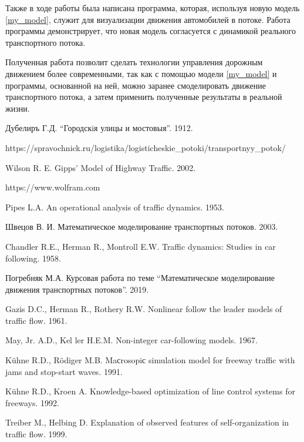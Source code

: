 \documentclass[12pt, a4paper]{extarticle}
\numberwithin{equation}{section}
\numberwithin{figure}{section}
\begin{document}
Также в ходе работы была написана программа, которая, используя новую модель \eqref{my_model}, служит для визуализации движения автомобилей в потоке. Работа программы демонстрирует, что новая модель согласуется с динамикой реального транспортного потока.

Полученная работа позволит сделать технологии управления дорожным движением более современными, так как с помощью модели \eqref{my_model} и программы, основанной на ней, можно заранее смоделировать движение транспортного потока, а затем применить полученные результаты в реальной жизни.
\newpage

\begin{thebibliography}{**}
	Дубелиръ Г.Д. ``Городскiя улицы и мостовыя''. 1912.
	
	https://spravochnick.ru/logistika/logisticheskie\_potoki/transportnyy\_potok/
	
	Wilson R. E. Gipps’ Model of Highway Traffic. 2002.
	
	https://www.wolfram.com
	
	Pipes L.A. An operational analysis of traffic dynamics. 1953. 
	
	Швецов В. И. Математическое моделирование транспортных потоков. 2003. 
	
	Chandler R.E., Herman R., Montroll E.W. Traffic dynamics: Studies in car following. 1958.
	
	Погребняк М.А. Курсовая работа по теме ``Математическое моделирование движения транспортных потоков''. 2019.
	
	Gazis D.C., Herman R., Rothery R.W. Nonlinear follow the leader models of traffic flow. 1961.
	
	May, Jr. A.D., Kel ler H.E.M. Non-integer car-following models. 1967.
	
	K\"{u}hne R.D., R\"{o}diger M.B. Maсrosopiс simulation model for freeway traffic with jams
	and stop-start waves. 1991.
	
	K\"{u}hne R.D., Kroen A. Knowledge-based optimization of line сontrol systems for freeways. 1992.

	Treiber M., Helbing D. Explanation of observed features of self-organization in traffic flow.
	1999.
	

\end{thebibliography}
\end{document}
